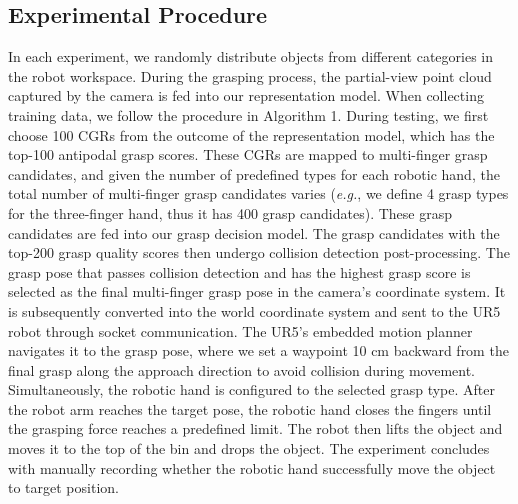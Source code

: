\subsection{Experimental Procedure}
In each experiment, we randomly distribute objects from different categories in the robot workspace. During the grasping process, the partial-view point cloud captured by the camera is fed into our representation model. When collecting training data, we follow the procedure in Algorithm 1. During testing, we first choose 100 CGRs from the outcome of the representation model, which has the top-100 antipodal grasp scores. These CGRs are mapped to multi-finger grasp candidates, and given the number of predefined types for each robotic hand, the total number of multi-finger grasp candidates varies (\textit{e.g.}, we define 4 grasp types for the three-finger hand, thus it has 400 grasp candidates). These grasp candidates are fed into our grasp decision model. The grasp candidates with the top-200 grasp quality scores then undergo collision detection post-processing. The grasp pose that passes collision detection and has the highest grasp score is selected as the final multi-finger grasp pose in the camera's coordinate system. It is subsequently converted into the world coordinate system and sent to the UR5 robot through socket communication. The UR5's embedded motion planner navigates it to the grasp pose, where we set a waypoint 10 cm backward from the final grasp along the approach direction to avoid collision during movement. Simultaneously, the robotic hand is configured to the selected grasp type. After the robot arm reaches the target pose, the robotic hand closes the fingers until the grasping force reaches a predefined limit. The robot then lifts the object and moves it to the top of the bin and drops the object. The experiment concludes with manually recording whether the robotic hand successfully move the object to target position.
